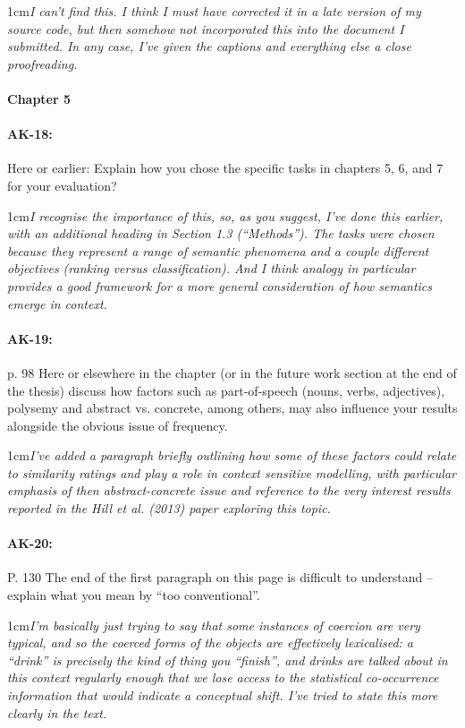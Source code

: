 \documentclass[11pt,a4paper]{article}
\newcommand{\res}[1]{\vspace{0.25cm} \begin{adjustwidth}{1cm}{}\emph{#1}\end{adjustwidth}}
\begin{document}
\res{I can't find this.  I think I must have corrected it in a late version of my source code, but then somehow not incorporated this into the document I submitted.  In any case, I've given the captions and everything else a close proofreading.}

\paragraph{Chapter 5}

\paragraph{AK-18:} Here or earlier: Explain how you chose the specific tasks in chapters 5, 6, and 7 for your evaluation?

\res{I recognise the importance of this, so, as you suggest, I've done this earlier, with an additional heading in Section 1.3 (``Methods'').  The tasks were chosen because they represent a range of semantic phenomena and a couple different objectives (ranking versus classification).  And I think analogy in particular provides a good framework for a more general consideration of how semantics emerge in context.}

\paragraph{AK-19:} p. 98 Here or elsewhere in the chapter (or in the future work section at the end of the thesis) discuss how factors such as part-of-speech (nouns, verbs, adjectives), polysemy and abstract vs. concrete, among others, may also influence your results alongside the obvious issue of frequency.

\res{I've added a paragraph briefly outlining how some of these factors could relate to similarity ratings and play a role in context sensitive modelling, with particular emphasis of then abstract-concrete issue and reference to the very interest results reported in the Hill et al. (2013) paper exploring this topic.}

\paragraph{AK-20:} P. 130 The end of the first paragraph on this page is difficult to understand – explain what you mean by ``too conventional''.

\res{I'm basically just trying to say that some instances of coercion are very typical, and so the coerced forms of the objects are effectively lexicalised: a ``drink'' is precisely the kind of thing you ``finish'', and drinks are talked about in this context regularly enough that we lose access to the statistical co-occurrence information that would indicate a conceptual shift.  I've tried to state this more clearly in the text.}
\end{document}

